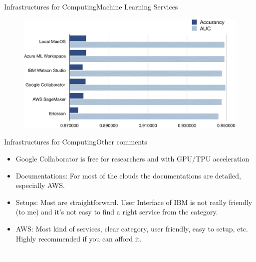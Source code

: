 \documentclass{beamer}
\begin{document}
\begin{frame}{Infrastructures for Computing}{Machine Learning Services}
\begin{figure}[h]
	\includegraphics[height=0.5\linewidth]{AA.png}
\end{figure}
\end{frame}

\begin{frame}{Infrastructures for Computing}{Other comments}
\begin{itemize}
	\item Google Collaborator is free for researchers and with GPU/TPU acceleration
	\item Documentations: For most of the clouds the documentations are detailed, especially AWS.  
	\item Setups: Most are  straightforward. User Interface of IBM is not really friendly (to me) and it's not easy to find a right service from the category.
	\item AWS: Most kind of services, clear category, user friendly, easy to setup, etc. Highly recommended if you can afford it.
\end{itemize}
\end{frame}


\bgroup
{}
\begin{frame}[t,plain]{}{}
  \begin{center}
    {\tiny \textcolor{white}{The End}}
  \end{center}
\end{frame}
\egroup
\end{document}
